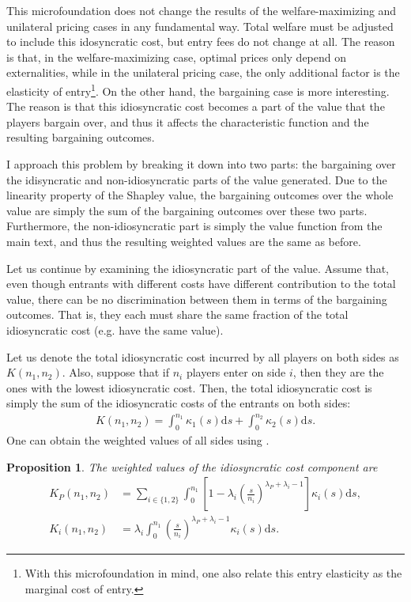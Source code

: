 \documentclass[a4paper]{article}
\newtheorem{proposition}{Proposition}
\newcommand{\ds}{\mathrm{d}s}
\begin{document}
This microfoundation does not change the results of the welfare-maximizing and unilateral pricing cases in any fundamental way.
Total welfare must be adjusted to include this idosyncratic cost, but entry fees do not change at all.
The reason is that, in the welfare-maximizing case, optimal prices only depend on externalities, while in the unilateral pricing case, the only additional factor is the elasticity of entry\footnote{
    With this microfoundation in mind, one also relate this entry elasticity as the marginal cost of entry.
}.
On the other hand, the bargaining case is more interesting.
The reason is that this idiosyncratic cost becomes a part of the value that the players bargain over, and thus it affects the characteristic function and the resulting bargaining outcomes.

I approach this problem by breaking it down into two parts: the bargaining over the idisyncratic and non-idiosyncratic parts of the value generated.
Due to the linearity property of the Shapley value, the bargaining outcomes over the whole value are simply the sum of the bargaining outcomes over these two parts.
Furthermore, the non-idiosyncratic part is simply the value function from the main text, and thus the resulting weighted values are the same as before.

Let us continue by examining the idiosyncratic part of the value.
Assume that, even though entrants with different costs have different contribution to the total value, there can be no discrimination between them in terms of the bargaining outcomes.
That is, they each must share the same fraction of the total idiosyncratic cost (e.g. have the same value).

Let us denote the total idiosyncratic cost incurred by all players on both sides as $K(n_1, n_2)$.
Also, suppose that if $n_i$ players enter on side $i$, then they are the ones with the lowest idiosyncratic cost.
Then, the total idiosyncratic cost is simply the sum of the idiosyncratic costs of the entrants on both sides:
\begin{align*}
    K(n_1, n_2) = \int_0^{n_1} \kappa_1(s) \ds + \int_0^{n_2} \kappa_2(s) \ds.
\end{align*}
One can obtain the weighted values of all sides using .
\begin{proposition}
    \label{prop:platform_bargaining_idiosyncratic}
    The weighted values of the idiosyncratic cost component are
    \begin{align*}
        K_P(n_1, n_2) &= \sum_{i \in \{1, 2\}} \int_0^{n_1} \left[ 1 - \lambda_i \left( \frac{s}{n_i} \right)^{\lambda_P + \lambda_i - 1} \right] \kappa_i(s) \ds, \\
        K_i(n_1, n_2) &= \lambda_i \int_0^{n_1} \left( \frac{s}{n_i} \right)^{\lambda_P + \lambda_i - 1} \kappa_i(s) \ds.
    \end{align*}
\end{proposition}
\end{document}
